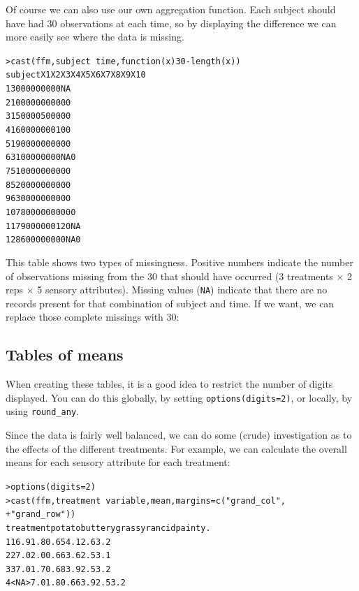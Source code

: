 \documentclass[oneside,letterpaper]{scrartcl}
\begin{document}
Of course we can also use our own aggregation function.  Each subject should have had 30 observations at each time, so by displaying the difference we can more easily see where the data is missing.

\begin{alltt}
> cast(ffm, subject ~ time, function(x) 30 - length(x))
   subject X1 X2 X3 X4 X5 X6 X7 X8 X9 X10
1        3  0  0  0  0  0  0  0  0  0  NA
2       10  0  0  0  0  0  0  0  0  0   0
3       15  0  0  0  0  5  0  0  0  0   0
4       16  0  0  0  0  0  0  0  1  0   0
5       19  0  0  0  0  0  0  0  0  0   0
6       31  0  0  0  0  0  0  0  0 NA   0
7       51  0  0  0  0  0  0  0  0  0   0
8       52  0  0  0  0  0  0  0  0  0   0
9       63  0  0  0  0  0  0  0  0  0   0
10      78  0  0  0  0  0  0  0  0  0   0
11      79  0  0  0  0  0  0  1  2  0  NA
12      86  0  0  0  0  0  0  0  0 NA   0

\end{alltt}

This table shows two types of missingness.  Positive numbers indicate the number of observations missing from the 30 that should have occurred (3 treatments $\times$ 2 reps $\times$ 5 sensory attributes).  Missing values ({\tt NA}) indicate that there are no records present for that combination of subject and time.  If we want, we can replace those complete missings with 30:


\subsection{Tables of means}\label{sub:tables_of_means}

When creating these tables, it is a good idea to restrict the number of digits displayed.  You can do this globally, by setting {\tt options(digits=2)}, or locally, by using {\tt round\_any}.

Since the data is fairly well balanced, we can do some (crude) investigation as to the effects of the different treatments.  For example, we can calculate the overall means for each sensory attribute for each treatment:

\begin{alltt}
> options(digits = 2)
> cast(ffm, treatment ~ variable, mean, margins = c("grand_col", 
+     "grand_row"))
  treatment potato buttery grassy rancid painty   .
1         1    6.9     1.8   0.65    4.1    2.6 3.2
2         2    7.0     2.0   0.66    3.6    2.5 3.1
3         3    7.0     1.7   0.68    3.9    2.5 3.2
4      <NA>    7.0     1.8   0.66    3.9    2.5 3.2

\end{alltt}
\end{document}

